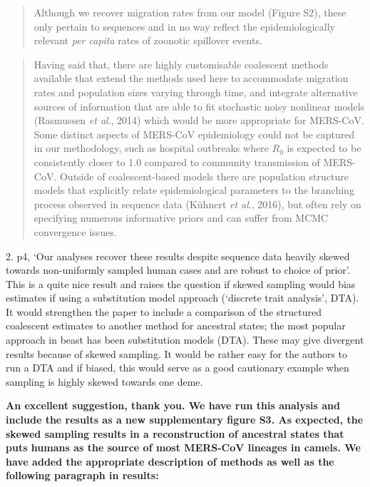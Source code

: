 \documentclass[11pt,oneside,letterpaper]{article}
\begin{document}
\begin{quotation}
Although we recover migration rates from our model (Figure S2), these only pertain to sequences and in no way reflect the epidemiologically relevant \textit{per capita} rates of zoonotic spillover events.
\end{quotation}

\begin{quotation}
Having said that, there are highly customisable coalescent methods available that extend the methods used here to accommodate migration rates and population sizes varying through time, and integrate alternative sources of information that are able to fit stochastic noisy nonlinear models (Rasmussen \textit{et al}., 2014) which would be more appropriate for MERS-CoV.
Some distinct aspects of MERS-CoV epidemiology could not be captured in our methodology, such as hospital outbreaks where $R_{0}$ is expected to be consistently closer to 1.0 compared to community transmission of MERS-CoV.
Outside of coalescent-based models there are population structure models that explicitly relate epidemiological parameters to the branching process observed in sequence data (K\"{u}hnert \textit{et al}., 2016), but often rely on specifying numerous informative priors and can suffer from MCMC convergence issues.
\end{quotation}

%
2. p4, `Our analyses recover these results despite sequence data heavily skewed towards non-uniformly sampled human cases and are robust to choice of prior'. This is a quite nice result and raises the question if skewed sampling would bias estimates if using a substitution model approach (`discrete trait analysis', DTA). It would strengthen the paper to include a comparison of the structured coalescent estimates to another method for ancestral states; the most popular approach in beast has been substitution models (DTA). These may give divergent results because of skewed sampling. It would be rather easy for the authors to run a DTA and if biased, this would serve as a good cautionary example when sampling is highly skewed towards one deme.

\textbf{An excellent suggestion, thank you. We have run this analysis and include the results as a new supplementary figure S3. As expected, the skewed sampling results in a reconstruction of ancestral states that puts humans as the source of most MERS-CoV lineages in camels. We have added the appropriate description of methods as well as the following paragraph in results:}
\end{document}
